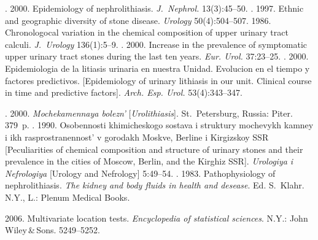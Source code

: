   \begin{multicols}{2}

\renewcommand{\bibname}{\protect\rmfamily References}

{\small\frenchspacing
{%
\begin{thebibliography}{99}

. 2000. Epidemiology of nephrolithiasis. 
\textit{J.~Nephrol.} 13(3):45--50.
. 1997. Ethnic and geographic diversity of stone 
disease. \textit{Urology} 50(4):504--507.
 1986. Chronologocal variation in the chemical composition of upper urinary tract 
calculi. \textit{J.~Urology} 136(1):5--9.
. 2000. Increase in 
the prevalence of symptomatic upper urinary tract stones during the last ten years. \textit{Eur. Urol.} 
37:23--25.
. 2000. Epidemiologia de la litiasis urinaria en nuestra Unidad. Evolucion en el tiempo y 
factores predictivos. [Epidemiology of urinary lithiasis in our unit. Clinical course in time and predictive 
factors]. \textit{Arch. Esp. Urol.} 53(4):343--347.


. 2000. 
\textit{Mochekamennaya bolezn'} [\textit{Urolithiasis}]. St.\ Petersburg, Russia: Piter. 379~p.
. 1990. 
Osobennosti khimicheskogo sostava i struktury mochevykh kamney i ikh rasprostranennost' v 
gorodakh Moskve, Berline i Kirgizskoy SSR [Peculiarities of chemical composition and
structure of urinary stones and their prevalence in the cities of Moscow,
Berlin, and the Kirghiz SSR]. \textit{Urologiya i Nefrologiya} [Urology and Nefrology] 5:49--54.
. 1983. Pathophysiology of
nephrolithiasis. \textit{The kidney and body fluids in health
and desease}. Ed. S.~Klahr. N.Y., L.: Plenum Medical Books.



 2006. Multivariate location tests. \textit{Encyclopedia of 
statistical sciences}. 
N.Y.: John Wiley\,\&\,Sons. 5249--5252.




\end{thebibliography}}}
\end{multicols}
